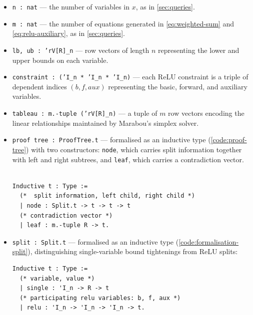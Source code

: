 \begin{itemize}
    \item \texttt{n : nat} --- the number of variables in $x$, as in \autoref{sec:queries}.

    \item \texttt{m : nat} --- the number of equations generated in \autoref{eq:weighted-sum} and \autoref{eq:relu-auxiliary}, as in  \autoref{sec:queries}.

    \item \texttt{lb, ub : 'rV[R]\_n} --- row vectors of length $n$ representing the lower and upper bounds on each variable.

    \item \texttt{constraint : ('I\_n * 'I\_n * 'I\_n)} --- each ReLU constraint is a triple of dependent indices $(b, f, aux)$ representing the basic, forward, and auxiliary variables.

    \item \texttt{tableau : m.-tuple ('rV[R]\_n)} --- a tuple of $m$ row vectors encoding the linear relationships maintained by Marabou's simplex solver.

    \item \texttt{proof tree : ProofTree.t} --- formalised as an inductive type (\autoref{code:proof-tree}) with two constructors: \texttt{node}, which carries split information together with left and right subtrees, and \texttt{leaf}, which carries a contradiction vector.
\begin{lstlisting}[language=Coq, caption={Marabou proof tree as an inductive data type in Rocq.}, label={code:proof-tree}, basicstyle=\footnotesize\ttfamily]

Inductive t : Type :=
  (*  split information, left child, right child *)
  | node : Split.t -> t -> t -> t
  (* contradiction vector *)
  | leaf : m.-tuple R -> t.
\end{lstlisting}

    \item \texttt{split : Split.t} --- formalised as an inductive type (\autoref{code:formalisation-split}), distinguishing single-variable bound tightenings from ReLU splits:
\begin{lstlisting}[language=Coq, caption={Split inductive type for case splits.}, label={code:formalisation-split}, basicstyle=\footnotesize\ttfamily]
Inductive t : Type :=
  (* variable, value *)
  | single : 'I_n -> R -> t
  (* participating relu variables: b, f, aux *)
  | relu : 'I_n -> 'I_n -> 'I_n -> t.
\end{lstlisting}
\end{itemize}

